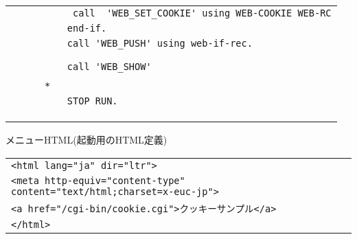 {\begin{tabular}{|l|}
\vspace{-0.4em}\verb!           call  'WEB_SET_COOKIE' using WEB-COOKIE WEB-RC!\\
\vspace{-0.4em}\verb!          end-if.!\\
\vspace{-0.4em}\verb!          call 'WEB_PUSH' using web-if-rec.!\\
\vspace{-0.4em}\verb!!\\
\vspace{-0.4em}\verb!!\\
\vspace{-0.4em}\verb!          call 'WEB_SHOW'!\\
\vspace{-0.4em}\verb!!\\
\vspace{-0.4em}\verb!      *!\\
\vspace{-0.4em}\verb!          STOP RUN.!\\
\vspace{-0.4em}\verb!!\\
\vspace{-0.4em}\verb!!\\
\\
\hline
\end{tabular}
}

{\gt メニューHTML(起動用のHTML定義)}

\begin{tabular}{|l|}
\hline
\verb+<html lang="ja" dir="ltr">+\\
\verb+<meta http-equiv="content-type" content="text/html;charset=x-euc-jp">+\\
\verb+<a href="/cgi-bin/cookie.cgi">クッキーサンプル</a>+\\
\verb+</html>+\\
\hline
\end{tabular}
